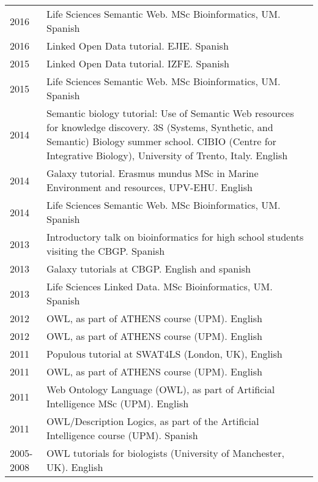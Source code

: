 \documentclass[11pt,fullpage]{article}
\begin{document}
\begin{longtable}{p{0.5in}|p{5.5in}}

2016 & Life Sciences Semantic Web. MSc Bioinformatics, UM. Spanish \\
2016 & Linked Open Data tutorial. EJIE. Spanish \\
2015 & Linked Open Data tutorial. IZFE. Spanish \\
2015 & Life Sciences Semantic Web. MSc Bioinformatics, UM. Spanish \\
2014 & Semantic biology tutorial: Use of Semantic Web resources for knowledge discovery. 3S (Systems, Synthetic, and Semantic) Biology summer school. CIBIO (Centre for Integrative Biology), University of Trento, Italy. English \\
2014 & Galaxy tutorial. Erasmus mundus MSc in Marine Environment and resources, UPV-EHU. English \\
2014 & Life Sciences Semantic Web. MSc Bioinformatics, UM. Spanish \\ %
2013 & Introductory talk on bioinformatics for high school students visiting the CBGP. Spanish \\
2013 & Galaxy tutorials at CBGP. English and spanish \\ %
2013 & Life Sciences Linked Data. MSc Bioinformatics, UM. Spanish \\
2012 & OWL, as part of ATHENS course (UPM). English \\
2012 & OWL, as part of ATHENS course (UPM). English \\
2011 & Populous tutorial at SWAT4LS (London, UK), English \\
2011 & OWL, as part of ATHENS course (UPM). English \\
2011 & Web Ontology Language (OWL), as part of Artificial Intelligence MSc (UPM). English \\ %
2011 & OWL/Description Logics, as part of the Artificial Intelligence course (UPM). Spanish \\ %
2005-2008 & OWL tutorials for biologists (University of Manchester, UK). English \\

\end{longtable}
\end{document}
